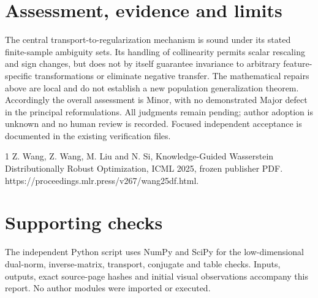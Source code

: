 \documentclass[10pt]{article}
\begin{document}
\section*{Assessment, evidence and limits}
The central transport-to-regularization mechanism is sound under its stated finite-sample ambiguity sets. Its handling of collinearity permits scalar rescaling and sign changes, but does not by itself guarantee invariance to arbitrary feature-specific transformations or eliminate negative transfer. The mathematical repairs above are local and do not establish a new population generalization theorem. Accordingly the overall assessment is Minor, with no demonstrated Major defect in the principal reformulations. All judgments remain pending; author adoption is unknown and no human review is recorded. Focused independent acceptance is documented in the existing verification files.\par
1 Z. Wang, Z. Wang, M. Liu and N. Si, Knowledge-Guided Wasserstein Distributionally Robust Optimization, ICML 2025, frozen publisher PDF. https://proceedings.mlr.press/v267/wang25df.html.\par
\section*{Supporting checks}
The independent Python script uses NumPy and SciPy for the low-dimensional dual-norm, inverse-matrix, transport, conjugate and table checks. Inputs, outputs, exact source-page hashes and initial visual observations accompany this report. No author modules were imported or executed.\par
\end{document}
